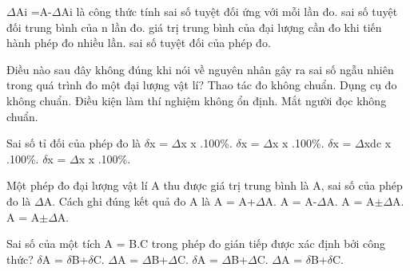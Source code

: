 \begin{ex}
$\Delta$Ai =A-$\Delta$Ai là công thức tính
\choice
{\True sai số tuyệt đối ứng với mỗi lần đo.}
{sai số tuyệt đối trung bình của n lần đo.}
{giá trị trung bình của đại lượng cần đo khi tiến hành phép đo nhiều lần.}
{sai số tuyệt đối của phép đo.}
\end{ex}

\begin{ex}
Điều nào sau đây không đúng khi nói về nguyên nhân gây ra sai số ngẫu
nhiên trong quá trình đo một đại lượng vật lí?
\choice
{Thao tác đo không chuẩn.}
{\True Dụng cụ đo không chuẩn.}
{Điều kiện làm thí nghiệm không ổn định.}
{Mắt người đọc không chuẩn.}
\end{ex}

\begin{ex}
Sai số tỉ đối của phép đo là
\choice
{$\delta$x = $\Delta$x x .100\%.}
{\True $\delta$x = $\Delta$x x .100\%.}
{$\delta$x = $\Delta$xdc x .100\%.}
{$\delta$x = $\Delta$x x .100\%.}
\end{ex}

\begin{ex}
Một phép đo đại lượng vật lí A thu được giá trị trung bình là A, sai số của
phép đo là $\Delta$A. Cách ghi đúng kết quả đo A là
\choice
{A = A+$\Delta$A.}
{A = A-$\Delta$A.}
{A = A$\pm$$\Delta$A.}
{\True A = A$\pm$$\Delta$A.}
\end{ex}

\begin{ex}
Sai số của một tích A = B.C trong phép đo gián tiếp được xác định bởi công
thức?
\choice
{\True $\delta$A = $\delta$B+$\delta$C.}
{$\Delta$A = $\Delta$B+$\Delta$C.}
{$\delta$A = $\Delta$B+$\Delta$C.}
{$\Delta$A = $\delta$B+$\delta$C.}
\end{ex}

